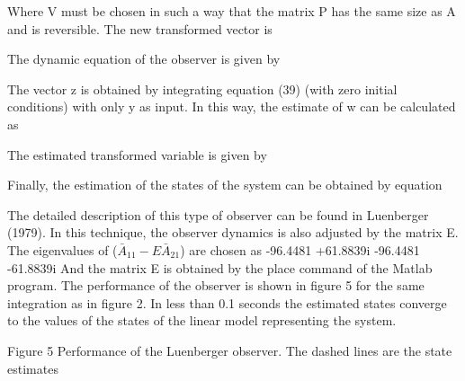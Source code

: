 \documentclass[sublist,a4paper,twoside,11pt]{article}
\begin{document}
Where V must be chosen in such a way that the matrix P has the same size as A and is reversible.
The new transformed vector is

The dynamic equation of the observer is given by

The vector z is obtained by integrating equation (39) (with zero initial conditions) with only y as input. In this way, the estimate of w can be calculated as 

The estimated transformed variable is given by

Finally, the estimation of the states of the system can be obtained by equation

The detailed description of this type of observer can be found in Luenberger (1979).
In this technique, the observer dynamics is also adjusted by the matrix E. The eigenvalues of ($\bar{A}_11-E \bar{A} _{21}$) are chosen as
-96.4481 +61.8839i
-96.4481 -61.8839i
And the matrix E is obtained by the place command of the Matlab program.
The performance of the observer is shown in figure 5 for the same integration as in figure 2. In less than 0.1 seconds the estimated states converge to the values of the states of the linear model representing the system. 



Figure 5 Performance of the Luenberger observer. The dashed lines are the state estimates





\end{document}
